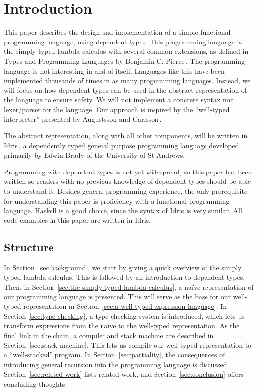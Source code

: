 \section{Introduction}
\label{sec:introduction}

This paper describes the design and implementation of a simple functional programming language, using dependent types. This programming language is the simply typed lambda calculus with several common extensions, as defined in Types and Programming Languages by Benjamin C. Pierce\,\cite{Pierce:TypeSystems}. The programming language is not interesting in and of itself. Languages like this have been implemented thousands of times in as many programming languages. Instead, we will focus on how dependent types can be used in the abstract representation of the language to ensure safety. We will not implement a concrete syntax nor lexer/parser for the language. Our approach is inspired by the ``well-typed interpreter'' presented by Augustsson and Carlsson\,\cite{Augustsson99anexercise}. 

The abstract representation, along with all other components, will be written in Idris\,\cite{Idris}, a dependently typed general purpose programming language developed primarily by Edwin Brady of the University of St Andrews.  

Programming with dependent types is not yet widespread, so this paper has been written so readers with no previous knowledge of dependent types should be able to understand it. Besides general programming experience, the only prerequisite for understanding this paper is proficiency with a functional programming language. Haskell is a good choice, since the syntax of Idris is very similar. All code examples in this paper are written in Idris.

\subsection{Structure}
In Section~\ref{sec:background}, we start by giving a quick overview of the simply typed lambda calculus. This is followed by an introduction to dependent types. Then, in Section~\ref{sec:the-simply-typed-lambda-calculus}, a naïve representation of our programming language is presented. This will serve as the base for our well-typed representation in Section~\ref{sec:a-well-typed-expression-language}. In Section~\ref{sec:type-checking}, a type-checking system is introduced, which lets us transform expressions from the naïve to the well-typed representation. As the final link in the chain, a compiler and stack machine are described in Section~\ref{sec:stack-machine}. This lets us compile our well-typed representation to a ``well-stacked'' program. In Section~\ref{sec:partiality}, the consequences of introducing general recursion into the programming language is discussed. Section~\ref{sec:related-work} lists related work, and Section~\ref{sec:conclusion} offers concluding thoughts.
